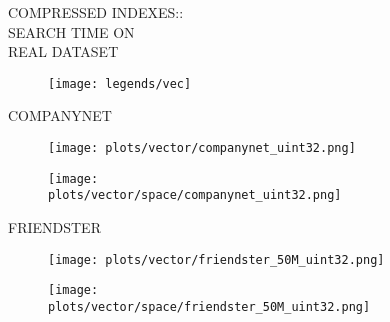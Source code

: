 \documentclass{article}
\begin{document}
\begin{figure}[!htbp]
\fbox
{
\begin{minipage}[t][0.98\textheight][t]{\textwidth}
\centering
\vspace*{-0.2cm}
    \begin{minipage}{0.23\linewidth}
    \footnotesize{COMPRESSED INDEXES::\\SEARCH TIME ON \\ REAL DATASET}
    \end{minipage}
   \begin{minipage}{0.75\linewidth}
        \begin{figure}[H]
        \texttt{[image: legends/vec]}
        \end{figure}
    \end{minipage}

    \begin{minipage}{0.03\linewidth}
    \begin{sideways}\small COMPANYNET\end{sideways}
    \end{minipage}
    \begin{minipage}{0.3\linewidth}
        \begin{figure}[H]
        \texttt{[image: plots/vector/companynet\_uint32.png]}
        \end{figure}
    \end{minipage}
    \begin{minipage}{0.3\linewidth}
        \begin{figure}[H]
            \texttt{[image: plots/vector/space/companynet\_uint32.png]}
        \end{figure}
    \end{minipage}
    \vspace*{-20px}

    \begin{minipage}{0.03\linewidth}
    \begin{sideways}\small FRIENDSTER\end{sideways}
    \end{minipage}
    \begin{minipage}{0.3\linewidth}
        \begin{figure}[H]
        \texttt{[image: plots/vector/friendster\_50M\_uint32.png]}
        \end{figure}
    \end{minipage}
    \begin{minipage}{0.3\linewidth}
        \begin{figure}[H]
            \texttt{[image: plots/vector/space/friendster\_50M\_uint32.png]}
        \end{figure}
    \end{minipage}
    \vspace*{-20px}


\end{minipage}}
\end{figure}
\end{document}
